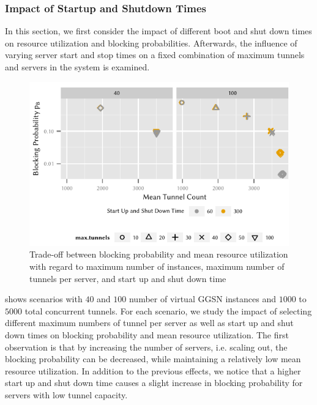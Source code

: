 \subsubsection*{Impact of Startup and Shutdown Times}\label{sec:cloud_virtualized_network_functions:startup_shutdown}

In this section, we first consider the impact of different boot and shut down times on resource utilization and blocking probabilities.
Afterwards, the influence of varying server start and stop times on a fixed combination of maximum tunnels and servers in the system is examined.

\begin{figure}
  \centering
  \includegraphics{cloud/virtualized_network_functions/performance_evaluation/figures/compare_util_block}
  \caption{Trade-off between blocking probability and mean resource utilization with regard to maximum number of instances, maximum number of tunnels per server, and start up and shut down time}
  \label{fig:cloud_virtualized_network_functions:startup_shutdown:compare_util_block}
\end{figure}

 shows scenarios with \(40\) and \(100\) number of virtual \gls{GGSN} instances and  \(1000\) to \(5000\) total concurrent tunnels.
For each scenario, we study the impact of selecting different maximum numbers of tunnel per server as well as start up and shut down times on blocking probability and mean resource utilization.
The first observation is that by increasing the number of servers, i.e. scaling out, the blocking probability can be decreased, while maintaining a relatively low mean resource utilization.
In addition to the previous effects, we notice that a higher start up and shut down time causes a slight increase in blocking probability for servers with low tunnel capacity.

